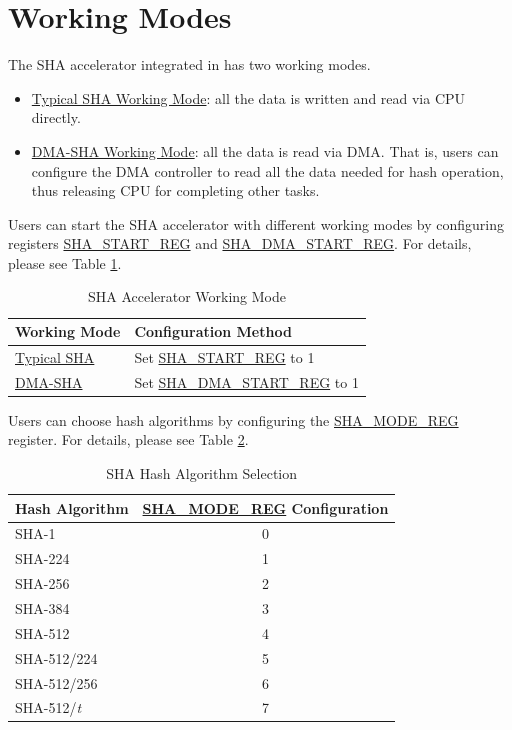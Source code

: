 \documentclass[main\_\_EN.tex]{subfiles}
\begin{document}
\section{Working Modes}
The SHA accelerator integrated in \chipname{} has two working modes.

\begin{itemize}
    \item \hyperref[sec:sha-typical-sha]{Typical SHA Working Mode}: all the data is written and read via CPU directly.
    \item \hyperref[sec:sha-dma-sha]{DMA-SHA Working Mode}: all the data is read via DMA. That is, users can configure the DMA controller to read all the data needed for hash operation, thus releasing CPU for completing other tasks.
\end{itemize}

Users can start the SHA accelerator with different working modes by configuring registers \hyperref[regdesc:SHASTARTREG]{SHA\_START\_REG} and \hyperref[regdesc:SHADMASTARTREG]{SHA\_DMA\_START\_REG}. For details, please see Table \ref{tab:sha-working-mode}.

\begin{longtable}[c]{ | l | l | }
\caption{SHA Accelerator Working Mode}
\label{tab:sha-working-mode}
\\\hline
\rowcolor{lightgray}
Working Mode      & Configuration Method\\
    \hline
    \hyperref[sec:sha-typical-sha]{Typical SHA}      &  Set \hyperref[regdesc:SHASTARTREG]{SHA\_START\_REG} to 1   \\
    \hline
    \hyperref[sec:sha-dma-sha]{DMA-SHA}           &  Set \hyperref[regdesc:SHADMASTARTREG]{SHA\_DMA\_START\_REG} to 1   \\
    \hline
\end{longtable}

Users can choose hash algorithms by configuring the \hyperref[regdesc:SHAMODEREG]{SHA\_MODE\_REG} register. For details, please see Table \ref{tab:sha-hash-algo-select}.

\begin{longtable}[c]{| l | c |}
\caption{SHA Hash Algorithm Selection}
\label{tab:sha-hash-algo-select}
\\\hline
\rowcolor{lightgray}
Hash Algorithm & \hyperref[regdesc:SHAMODEREG]{SHA\_MODE\_REG} Configuration\\
    \hline
    SHA-1 & 0\\
    \hline
    SHA-224 & 1\\
    \hline
    SHA-256 & 2\\
    \hline
    SHA-384 & 3\\
    \hline
    SHA-512 & 4\\
    \hline
    SHA-512/224 & 5\\
    \hline
    SHA-512/256 & 6\\
    \hline
    SHA-512/{\it{t}} & 7\\
    \hline
\end{longtable}
\end{document}
